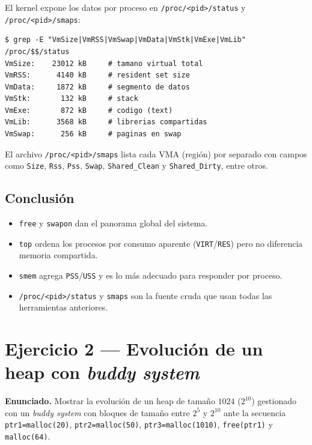 \documentclass[11pt,a4paper]{article}
\begin{document}
El kernel expone los datos por proceso en \texttt{/proc/<pid>/status}
y \texttt{/proc/<pid>/smaps}:

\begin{lstlisting}[style=shellstyle]
$ grep -E "VmSize|VmRSS|VmSwap|VmData|VmStk|VmExe|VmLib" /proc/$$/status
VmSize:    23012 kB     # tamano virtual total
VmRSS:      4140 kB     # resident set size
VmData:     1872 kB     # segmento de datos
VmStk:       132 kB     # stack
VmExe:       872 kB     # codigo (text)
VmLib:      3568 kB     # librerias compartidas
VmSwap:      256 kB     # paginas en swap
\end{lstlisting}

El archivo \texttt{/proc/<pid>/smaps} lista cada VMA (región) por
separado con campos como \texttt{Size}, \texttt{Rss}, \texttt{Pss},
\texttt{Swap}, \texttt{Shared\_Clean} y \texttt{Shared\_Dirty}, entre
otros.

\subsection*{Conclusión}

\begin{itemize}[leftmargin=*,nosep]
    \item \texttt{free} y \texttt{swapon} dan el panorama global del
        sistema.
    \item \texttt{top} ordena los procesos por consumo aparente
        (\texttt{VIRT}/\texttt{RES}) pero no diferencia memoria
        compartida.
    \item \texttt{smem} agrega \texttt{PSS}/\texttt{USS} y es lo más
        adecuado para responder por proceso.
    \item \texttt{/proc/<pid>/status} y \texttt{smaps} son la fuente
        cruda que usan todas las herramientas anteriores.
\end{itemize}

\section{Ejercicio 2 --- Evolución de un heap con \emph{buddy system}}

\textbf{Enunciado.} Mostrar la evolución de un heap de tamaño $1024$
($2^{10}$) gestionado con un \emph{buddy system} con bloques de tamaño
entre $2^5$ y $2^{10}$ ante la secuencia
\texttt{ptr1=malloc(20)},
\texttt{ptr2=malloc(50)},
\texttt{ptr3=malloc(1010)},
\texttt{free(ptr1)} y \texttt{malloc(64)}.
\end{document}
